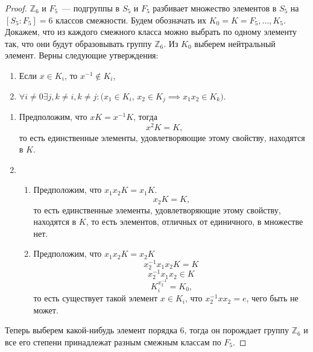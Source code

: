 \documentclass[utf8,a4paper,12pt]{article}
\begin{document}
\begin{proof}
$\mathbb{Z}_6$ и $F_5$~--- подгруппы в $S_5$ и $F_5$ разбивает множество элементов в $S_5$ на $[S_5:F_5]=6$ классов смежности. Будем обозначать их $K_0=K=F_5,\ldots,K_5$. Докажем, что из каждого смежного класса можно выбрать по одному элементу так, что они будут образовывать группу $\mathbb{Z}_6$. Из $K_0$ выберем нейтральный элемент. Верны следующие утверждения:
\begin{enumerate}
\item Если $x\in K_i$, то $x^{-1}\not\in K_i$,
\item $\forall i\not=0\exists j, k\not=i,k\not=j: (x_1\in K_i$, $x_2\in K_j\implies x_1x_2\in K_k)$.
\end{enumerate}

\begin{enumerate}
\item Предположим, что $xK=x^{-1}K$, тогда $$x^2K=K\text{,}$$ то есть единственные элементы, удовлетворяющие этому свойству, находятся в $K$.
\item
\begin{enumerate}
\item Предположим, что $x_1x_2K=x_1K$.
$$x_2K=K\text{,}$$
то есть единственные элементы, удовлетворяющие этому свойству, находятся в $K$, то есть элементов, отличных от единичного, в множестве нет.
\item Предположим, что $x_1x_2K=x_2K$
$$x_2^{-1}x_1x_2K=K$$
$$x_2^{-1}x_1x_2\in K$$
$$K_i^{x_2^{-1}}=K_0\text{,}$$ то есть существует такой элемент $x\in K_i$, что $x_2^{-1}xx_2=e$, чего быть не может.
\end{enumerate}
\end{enumerate}
Теперь выберем какой-нибудь элемент порядка 6, тогда он порождает группу $\mathbb{Z}_6$ и все его степени принадлежат разным смежным классам по $F_5$.
\end{proof}
\end{document}

